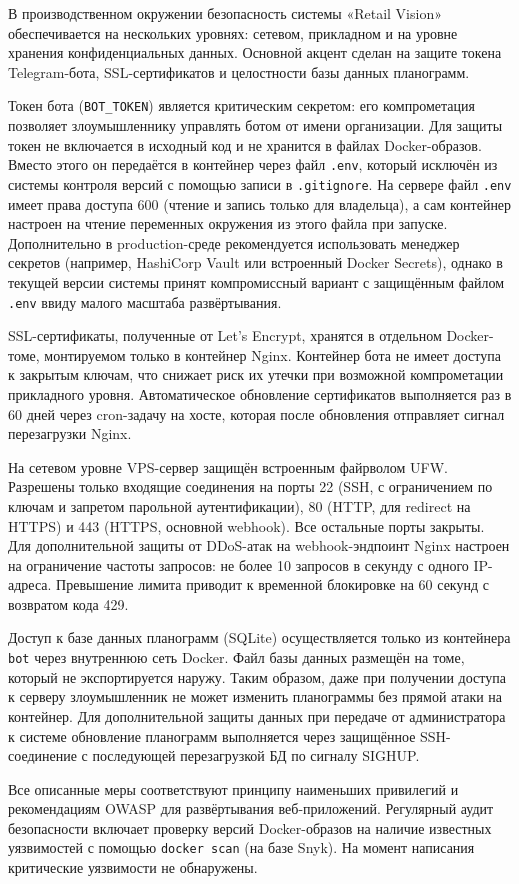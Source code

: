 {\gostFont

	\par \redline В производственном окружении безопасность системы «Retail Vision» обеспечивается на нескольких уровнях: сетевом, прикладном и на уровне хранения конфиденциальных данных.
	Основной акцент сделан на защите токена Telegram-бота, SSL-сертификатов и целостности базы данных планограмм.
	\par \redline Токен бота (\texttt{BOT\_TOKEN}) является критическим секретом: его компрометация позволяет злоумышленнику управлять ботом от имени организации.
	Для защиты токен не включается в исходный код и не хранится в файлах Docker-образов.
	Вместо этого он передаётся в контейнер через файл \texttt{.env}, который исключён из системы контроля версий с помощью записи в \texttt{.gitignore}.
	На сервере файл \texttt{.env} имеет права доступа 600 (чтение и запись только для владельца), а сам контейнер настроен на чтение переменных окружения из этого файла при запуске.
	Дополнительно в production-среде рекомендуется использовать менеджер секретов (например, HashiCorp Vault или встроенный Docker Secrets), однако в текущей версии системы принят компромиссный вариант с защищённым файлом \texttt{.env} ввиду малого масштаба развёртывания.
	\par \redline SSL-сертификаты, полученные от Let's Encrypt, хранятся в отдельном Docker-томе, монтируемом только в контейнер Nginx.
	Контейнер бота не имеет доступа к закрытым ключам, что снижает риск их утечки при возможной компрометации прикладного уровня.
	Автоматическое обновление сертификатов выполняется раз в 60 дней через cron-задачу на хосте, которая после обновления отправляет сигнал перезагрузки Nginx.
	\par \redline На сетевом уровне VPS-сервер защищён встроенным файрволом UFW.
	Разрешены только входящие соединения на порты 22 (SSH, с ограничением по ключам и запретом парольной аутентификации), 80 (HTTP, для redirect на HTTPS) и 443 (HTTPS, основной webhook).
	Все остальные порты закрыты. Для дополнительной защиты от DDoS-атак на webhook-эндпоинт Nginx настроен на ограничение частоты запросов: не более 10 запросов в секунду с одного IP-адреса.
	Превышение лимита приводит к временной блокировке на 60 секунд с возвратом кода 429.

	\par \redline Доступ к базе данных планограмм (SQLite) осуществляется только из контейнера \texttt{bot} через внутреннюю сеть Docker.
	Файл базы данных размещён на томе, который не экспортируется наружу.
	Таким образом, даже при получении доступа к серверу злоумышленник не может изменить планограммы без прямой атаки на контейнер.
	Для дополнительной защиты данных при передаче от администратора к системе обновление планограмм выполняется через защищённое SSH-соединение с последующей перезагрузкой БД по сигналу SIGHUP.
	\par \redline Все описанные меры соответствуют принципу наименьших привилегий и рекомендациям OWASP для развёртывания веб-приложений.
	Регулярный аудит безопасности включает проверку версий Docker-образов на наличие известных уязвимостей с помощью \texttt{docker scan} (на базе Snyk).
	На момент написания критические уязвимости не обнаружены.

}
